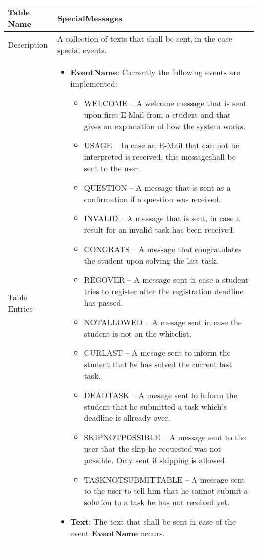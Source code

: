 \begin{tabular}{|p{2.5cm}|p{11cm}|}
\hline
Table Name & SpecialMessages \\
\hline
Description & A collection of texts that shall be sent, in the case special events. \\
\hline
Table Entries & \begin{itemize}
    \item {\bf EventName}: Currently the following events are implemented:
        \begin{itemize}
        \item WELCOME -- A welcome message that is sent upon first E-Mail from a student 
			and that gives an explanation of how the system works.
        \item USAGE -- In case an E-Mail that can not be interpreted is received, this 
		messageshall be sent to the user.
        \item QUESTION -- A message that is sent as a confirmation if a question was 
			received.
        \item INVALID -- A message that is sent, in case a result for an invalid task has
                been received.
        \item CONGRATS -- A message that congratulates the student upon solving the 
			last task.
        \item REGOVER -- A message sent in case a student tries to register after the 
			registration deadline has passed.
        \item NOTALLOWED -- A mesage sent in case the student is not on the whitelist.
        \item CURLAST -- A mesage sent to inform the student that he has solved the 
			current last task.
        \item DEADTASK -- A mesage sent to inform the student that he submitted a task 
			which's deadline is allready over.
		\item SKIPNOTPOSSIBLE -- A message sent to the user that the skip he
			requested was not possible. Only sent if skipping is allowed.
		\item TASKNOTSUBMITTABLE -- A message sent to the user to tell him that
			he cannot submit a solution to a task he has not received yet.
        \end{itemize}
        \item {\bf Text}: The text that shall be sent in case of the event {\bf EventName}
			occurs.
    \end{itemize} \\
\hline
\end{tabular}

